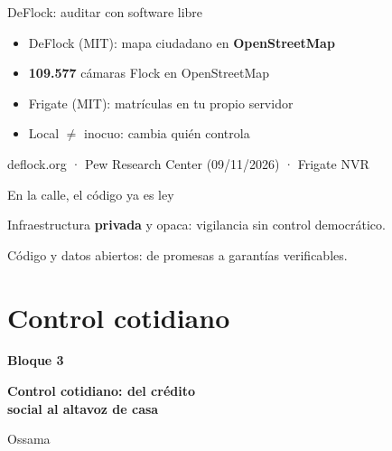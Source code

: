 \documentclass[aspectratio=169,12pt]{beamer}
\newcommand{\bloque}[3]{%
  \begin{frame}[plain]
    \vfill
    \begin{center}
      {\color{terra}\large\bfseries Bloque #1}\\[0.3cm]
      {\color{azul}\LARGE\bfseries #2\par}\vspace{0.5cm}
      {\large #3}
    \end{center}
    \vfill
  \end{frame}}
\newcommand{\fuente}[1]{\vfill{\small\color{gris}#1\par}}
\begin{document}
\begin{frame}{DeFlock: auditar con software libre}
  \begin{itemize}
    \item DeFlock (MIT): mapa ciudadano en \textbf{OpenStreetMap}
    \item \alert{\textbf{109.577}} cámaras Flock en OpenStreetMap
    \item Frigate (MIT): matrículas en tu propio servidor
    \item Local $\neq$ inocuo: cambia quién controla
  \end{itemize}
  \fuente{deflock.org · Pew Research Center (09/11/2026) · Frigate NVR}
\end{frame}

\begin{frame}{En la calle, el código ya es ley}
  \vspace{0.3cm}
  {\Large Infraestructura \alert{\textbf{privada}} y opaca: vigilancia sin control democrático.\par}
  \vspace{0.8cm}
  {\Large Código y datos abiertos: de promesas a garantías verificables.\par}
\end{frame}

\section{Control cotidiano}
\bloque{3}{Control cotidiano: del crédito\\social al altavoz de casa}{Ossama}

\newcommand{\cifram}[2]{%
  \begin{center}
    {\color{terra}\fontsize{26}{30}\selectfont\bfseries #1}\\[0.15cm]
    {\normalsize #2}
  \end{center}}
\end{document}
